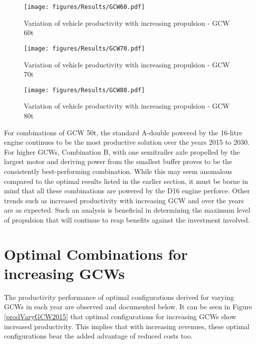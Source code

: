 \documentclass[ExampleMasters.tex]{subfiles}
\begin{document}
	\begin{figure}[H]
		\centering
		\texttt{[image: figures/Results/GCW60.pdf]}
		\caption{Variation of vehicle productivity with increasing propulsion - GCW 60t}
		\label{prodPropGCW60}
	\end{figure}

	\begin{figure}[H]
		\centering
		\texttt{[image: figures/Results/GCW70.pdf]}
		\caption{Variation of vehicle productivity with increasing propulsion - GCW 70t}
		\label{prodPropGCW70}
	\end{figure}

	\begin{figure}[H]
		\centering
		\texttt{[image: figures/Results/GCW80.pdf]}
		\caption{Variation of vehicle productivity with increasing propulsion - GCW 80t}
		\label{prodPropGCW80}
	\end{figure}

For combinations of GCW 50t, the standard A-double powered by the 16-litre engine continues to be the most productive solution over the years 2015 to 2030. For higher GCWs, Combination B, with one semitrailer axle propelled by the largest motor and deriving power from the smallest buffer proves to be the consistently best-performing combination. While this may seem anomalous compared to the optimal results listed in the earlier section, it must be borne in mind that all these combinations are powered by the D16 engine perforce. Other trends such as increased productivity with increasing GCW and over the years are as expected. Such an analysis is beneficial in determining the maximum level of propulsion that will continue to reap benefits against the investment involved.\\

\section{Optimal Combinations for increasing GCWs}
	The productivity performance of optimal configurations derived for varying GCWs in each year are observed and documented below. It can be seen in Figure \ref{prodVaryGCW2015} that optimal configurations for increasing GCWs show increased productivity. This implies that with increasing revenues, these optimal configurations bear the added advantage of reduced costs too.\\
\end{document}
